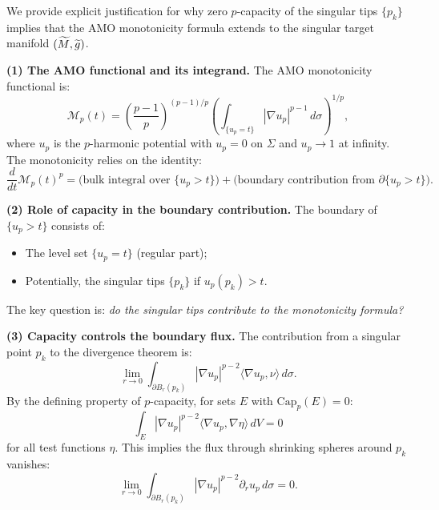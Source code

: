 \begin{remark}\label{rem:CapacityAMOConnection}
We provide explicit justification for why zero $p$-capacity of the singular tips $\{p_k\}$ implies that the AMO monotonicity formula extends to the singular target manifold $(\widetilde{M}, \widetilde{g})$.

\textbf{(1) The AMO functional and its integrand.} The AMO monotonicity functional is:
\begin{equation}
    \mathcal{M}_p(t) = \left( \frac{p-1}{p} \right)^{(p-1)/p} \left( \int_{\{u_p = t\}} |\nabla u_p|^{p-1} \, d\sigma \right)^{1/p},
\end{equation}
where $u_p$ is the $p$-harmonic potential with $u_p = 0$ on $\Sigma$ and $u_p \to 1$ at infinity. The monotonicity relies on the identity:
\begin{equation}\label{eq:AMOMonotonicityDerivative}
    \frac{d}{dt} \mathcal{M}_p(t)^p = \text{(bulk integral over } \{u_p > t\}\text{)} + \text{(boundary contribution from } \partial\{u_p > t\}\text{)}.
\end{equation}

\textbf{(2) Role of capacity in the boundary contribution.} The boundary of $\{u_p > t\}$ consists of:
\begin{itemize}
    \item The level set $\{u_p = t\}$ (regular part);
    \item Potentially, the singular tips $\{p_k\}$ if $u_p(p_k) > t$.
\end{itemize}
The key question is: \emph{do the singular tips contribute to the monotonicity formula?}

\textbf{(3) Capacity controls the boundary flux.} The contribution from a singular point $p_k$ to the divergence theorem is:
\begin{equation}
    \lim_{r \to 0} \int_{\partial B_r(p_k)} |\nabla u_p|^{p-2} \langle \nabla u_p, \nu \rangle \, d\sigma.
\end{equation}
By the defining property of $p$-capacity, for sets $E$ with $\mathrm{Cap}_p(E) = 0$:
\begin{equation}
    \int_E |\nabla u_p|^{p-2} \langle \nabla u_p, \nabla \eta \rangle \, dV = 0
\end{equation}
for all test functions $\eta$. This implies the flux through shrinking spheres around $p_k$ vanishes:
\begin{equation}
    \lim_{r \to 0} \int_{\partial B_r(p_k)} |\nabla u_p|^{p-2} \partial_r u_p \, d\sigma = 0.
\end{equation}


\end{remark}
